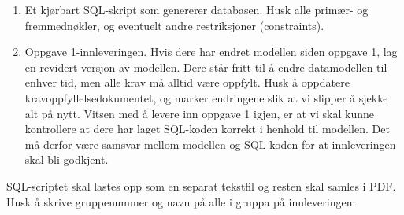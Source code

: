 \begin{enumerate}

\item
Et kjørbart SQL-skript som genererer databasen. Husk alle primær- og fremmednøkler, og eventuelt andre restriksjoner (constraints). 

\item
Oppgave 1-innleveringen. Hvis dere har endret modellen siden oppgave 1, lag en revidert versjon av modellen. Dere står fritt til å endre datamodellen til enhver tid, men alle krav må alltid være oppfylt. Husk å oppdatere kravoppfyllelsedokumentet, og marker endringene slik at vi slipper å sjekke alt på nytt. Vitsen med å levere inn oppgave 1 igjen, er at vi skal kunne kontrollere at dere har laget SQL-koden korrekt i henhold til modellen. Det må derfor være samsvar mellom modellen og SQL-koden for at innleveringen skal bli godkjent. 

\end{enumerate}

SQL-scriptet skal lastes opp som en separat tekstfil og resten skal samles i PDF.  Husk å skrive gruppenummer og navn på alle i gruppa på innleveringen.